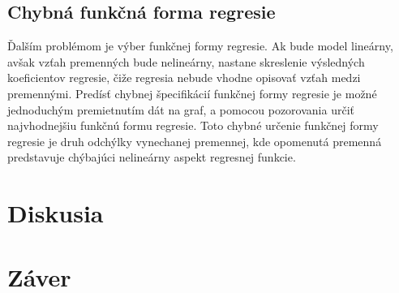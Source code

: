 \documentclass[]{tukediphc}
\begin{document}
\subsection{Chybná funkčná forma regresie}

Ďalším problémom je výber funkčnej formy regresie. Ak bude model lineárny, avšak vzťah premenných bude nelineárny, nastane skreslenie výsledných koeficientov regresie, čiže regresia nebude vhodne opisovať vzťah medzi premennými. Predísť chybnej špecifikácií funkčnej formy regresie je možné jednoduchým premietnutím dát na graf, a pomocou pozorovania určiť najvhodnejšiu funkčnú formu regresie. Toto chybné určenie funkčnej formy regresie je druh odchýlky vynechanej premennej, kde opomenutá premenná predstavuje chýbajúci nelineárny aspekt regresnej funkcie. 

\section{Diskusia}


\section{Záver}




%

%

%

%


\newpage
{}
\protect\label{page:posledna}
\end{document}
